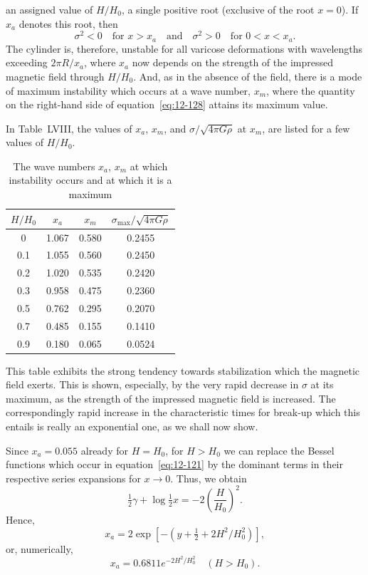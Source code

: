 an assigned value of $H/H_0$, a single positive root (exclusive of the root $x = 0$). If $x_a$ denotes this root, then
\begin{equation}
\label{eq:12-131}
\sigma^2 < 0 \quad \text{for } x > x_a \quad \text{and} \quad \sigma^2 > 0 \quad \text{for } 0 < x < x_a.
\end{equation}
The cylinder is, therefore, unstable for all varicose deformations with wavelengths exceeding $2\pi R/x_a$, where $x_a$ now depends on the strength of the impressed magnetic field through $H/H_0$. And, as in the absence of the field, there is a mode of maximum instability which occurs at a wave number, $x_m$, where the quantity on the right-hand side of equation~\eqref{eq:12-128} attains its maximum value.

In Table~LVIII, the values of $x_a$, $x_m$, and $\sigma/\sqrt{4\pi G\rho}$ at $x_m$, are listed for a few values of $H/H_0$.

\begin{table}[ht]
\centering
\caption{The wave numbers $x_a$, $x_m$ at which instability occurs and at which it is a maximum}
\label{tab:LVIII}
\begin{tabular}{cccc}
\hline
$H/H_0$ & $x_a$ & $x_m$ & $\sigma_{\max}/\sqrt{4\pi G\rho}$ \\
\hline
0 & 1.067 & 0.580 & 0.2455 \\
0.1 & 1.055 & 0.560 & 0.2450 \\
0.2 & 1.020 & 0.535 & 0.2420 \\
0.3 & 0.958 & 0.475 & 0.2360 \\
0.5 & 0.762 & 0.295 & 0.2070 \\
0.7 & 0.485 & 0.155 & 0.1410 \\
0.9 & 0.180 & 0.065 & 0.0524 \\
\hline
\end{tabular}
\end{table}

This table exhibits the strong tendency towards stabilization which the magnetic field exerts. This is shown, especially, by the very rapid decrease in $\sigma$ at its maximum, as the strength of the impressed magnetic field is increased. The correspondingly rapid increase in the characteristic times for break-up which this entails is really an exponential one, as we shall now show.

Since $x_a = 0.055$ already for $H = H_0$, for $H > H_0$ we can replace the Bessel functions which occur in equation~\eqref{eq:12-121} by the dominant terms in their respective series expansions for $x \to 0$. Thus, we obtain
\begin{equation}
\label{eq:12-132}
\tfrac{1}{2}\gamma + \log \tfrac{1}{2}x = -2\left(\frac{H}{H_0}\right)^2.
\end{equation}
Hence,
\begin{equation}
\label{eq:12-133}
x_a = 2\exp[-(y+\tfrac{1}{2}+2H^2/H_0^2)],
\end{equation}
or, numerically,
\begin{equation}
\label{eq:12-134}
x_a = 0.6811 e^{-2H^2/H_0^2} \quad (H > H_0).
\end{equation}


